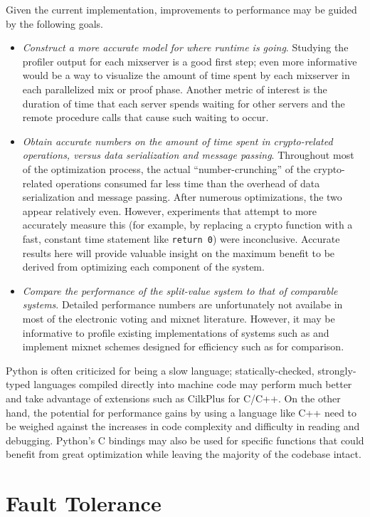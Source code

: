 Given the current implementation, improvements to performance may be guided by the following goals.
\begin{itemize}
\item \emph{Construct a more accurate model for where runtime is going}. Studying the profiler output for each mixserver is a good first step; even more informative would be a way to visualize the amount of time spent by each mixserver in each parallelized mix or proof phase. Another metric of interest is the duration of time that each server spends waiting for other servers and the remote procedure calls that cause such waiting to occur.
\item \emph{Obtain accurate numbers on the amount of time spent in crypto-related operations, versus data serialization and message passing}. Throughout most of the optimization process, the actual ``number-crunching'' of the crypto-related operations consumed far less time than the overhead of data serialization and message passing. After numerous optimizations, the two appear relatively even. However, experiments that attempt to more accurately measure this (for example, by replacing a crypto function with a fast, constant time statement like \texttt{return 0}) were inconclusive. Accurate results here will provide valuable insight on the maximum benefit to be derived from optimizing each component of the system.
\item \emph{Compare the performance of the split-value system to that of comparable systems}. Detailed performance numbers are unfortunately not availabe in most of the electronic voting and mixnet literature. However, it may be informative to profile existing implementations of systems such as \cite{votebox, adida-helios} and implement mixnet schemes designed for efficiency such as \cite{chase13} for comparison.
\end{itemize}

Python is often criticized for being a slow language; statically-checked, strongly-typed languages compiled directly into machine code may perform much better and take advantage of extensions such as CilkPlus for C/C++. On the other hand, the potential for performance gains by using a language like C++ need to be weighed against the increases in code complexity and difficulty in reading and debugging. Python's C bindings may also be used for specific functions that could benefit from great optimization while leaving the majority of the codebase intact.

\section{Fault Tolerance}

